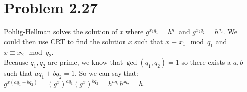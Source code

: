 \documentclass[10pt]{amsart}
\begin{document}
\section*{\large \textbf{Problem 2.27}}
\begin{addmargin}{5pt}
Pohlig-Hellman solves the solution of $x$ where $g^{x_{1}q_{1}} = h^{q_{1}}$ and 
$g^{x_{2}q_{2}} = h^{q_{2}}$. We could then use CRT to find the solution $x$ such
that $x \equiv x_{1} \mod q_{1}$ and  $x \equiv x_{2} \mod q_{2}$. \\

Because $q_{1}, q_{2}$ are prime, we know that $\gcd(q_{1}, q_{2}) = 1$ so there
exists a $a,b$ such that $aq_{1} + bq_{2} = 1$. So we can say that: \\
$g^{x(aq_{1} + bq_{2})} = (g^x)^{aq_{1}}(g^x)^{bq_{2}} =
h^{aq_{1}}h^{bq_{2}} = h$.

\end{addmargin}
\end{document}
